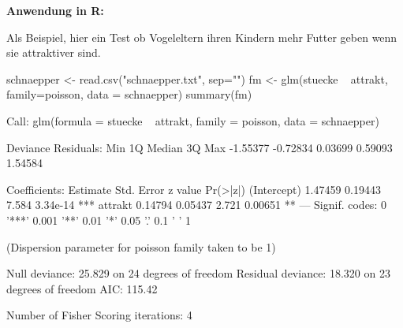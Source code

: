 \documentclass[a4paper,twoside]{tufte-book}\usepackage[]{graphicx}\usepackage[]{color}
\begin{document}
\vspace{1cm}
\begin{fullwidth}
\begin{mdframed}[backgroundcolor=black!10,rightline=false,leftline=false]
    
\textbf{Anwendung in R:} 

Als Beispiel, hier ein Test ob Vogeleltern ihren Kindern mehr Futter geben wenn sie attraktiver sind. 


\begin{Schunk}
\begin{Sinput}
schnaepper <- read.csv("schnaepper.txt", sep="")
fm <- glm(stuecke ~ attrakt, family=poisson, data = schnaepper)
summary(fm)
\end{Sinput}
\begin{Soutput}

Call:
glm(formula = stuecke ~ attrakt, family = poisson, data = schnaepper)

Deviance Residuals: 
     Min        1Q    Median        3Q       Max  
-1.55377  -0.72834   0.03699   0.59093   1.54584  

Coefficients:
            Estimate Std. Error z value Pr(>|z|)    
(Intercept)  1.47459    0.19443   7.584 3.34e-14 ***
attrakt      0.14794    0.05437   2.721  0.00651 ** 
---
Signif. codes:  0 '***' 0.001 '**' 0.01 '*' 0.05 '.' 0.1 ' ' 1

(Dispersion parameter for poisson family taken to be 1)

    Null deviance: 25.829  on 24  degrees of freedom
Residual deviance: 18.320  on 23  degrees of freedom
AIC: 115.42

Number of Fisher Scoring iterations: 4
\end{Soutput}
\end{Schunk}

\end{mdframed}
\end{fullwidth} 




\end{document}
